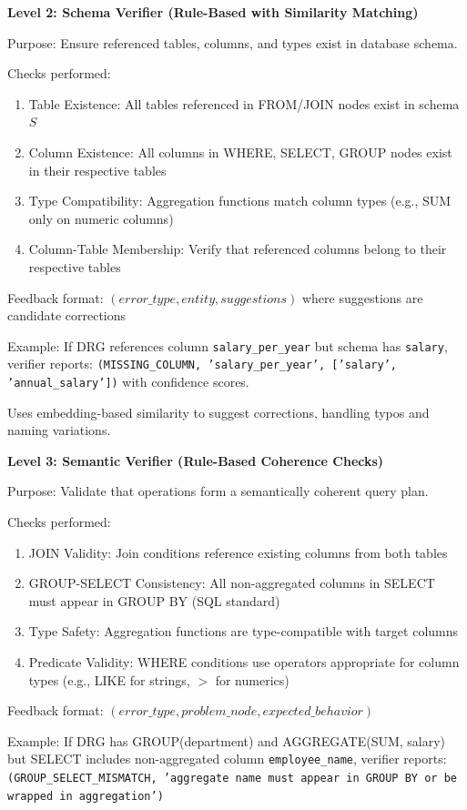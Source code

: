 \documentclass[conference]{IEEEtran}
\begin{document}
\textbf{Level 2: Schema Verifier (Rule-Based with Similarity Matching)}

Purpose: Ensure referenced tables, columns, and types exist in database schema.

Checks performed:
\begin{enumerate}
\item Table Existence: All tables referenced in FROM/JOIN nodes exist in schema $S$
\item Column Existence: All columns in WHERE, SELECT, GROUP nodes exist in their respective tables
\item Type Compatibility: Aggregation functions match column types (e.g., SUM only on numeric columns)
\item Column-Table Membership: Verify that referenced columns belong to their respective tables
\end{enumerate}

Feedback format: $(error\_type, entity, suggestions)$ where suggestions are candidate corrections

Example: If DRG references column \texttt{salary\_per\_year} but schema has \texttt{salary}, verifier reports: \texttt{(MISSING\_COLUMN, 'salary\_per\_year', ['salary', 'annual\_salary'])} with confidence scores.

Uses embedding-based similarity to suggest corrections, handling typos and naming variations.

\textbf{Level 3: Semantic Verifier (Rule-Based Coherence Checks)}

Purpose: Validate that operations form a semantically coherent query plan.

Checks performed:
\begin{enumerate}
\item JOIN Validity: Join conditions reference existing columns from both tables
\item GROUP-SELECT Consistency: All non-aggregated columns in SELECT must appear in GROUP BY (SQL standard)
\item Type Safety: Aggregation functions are type-compatible with target columns
\item Predicate Validity: WHERE conditions use operators appropriate for column types (e.g., LIKE for strings, $>$ for numerics)
\end{enumerate}

Feedback format: $(error\_type, problem\_node, expected\_behavior)$

Example: If DRG has GROUP(department) and AGGREGATE(SUM, salary) but SELECT includes non-aggregated column \texttt{employee\_name}, verifier reports: \texttt{(GROUP\_SELECT\_MISMATCH, 'aggregate name must appear in GROUP BY or be wrapped in aggregation')}
\end{document}
